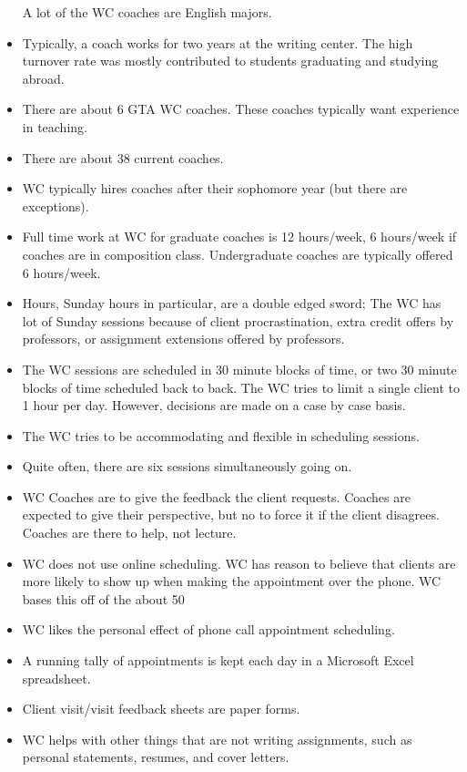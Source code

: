 \documentclass[12pt]{article} %
\begin{document}
\begin{itemize}
    A lot of the WC coaches are English majors.
    \item Typically, a coach works for two years at the writing center.  The high turnover rate was mostly contributed to students graduating and studying abroad.
    \item There are about 6 GTA WC coaches.  These coaches typically want experience in teaching.
    \item There are about 38 current coaches.
    \item WC typically hires coaches after their sophomore year (but there are exceptions).
    \item Full time work at WC for graduate coaches is 12 hours/week, 6 hours/week if coaches are in composition class.  Undergraduate coaches are typically offered 6 hours/week.
    \item Hours, Sunday hours in particular, are a double edged sword; The WC has lot of Sunday sessions because of client procrastination, extra credit offers by professors, or assignment extensions offered by professors.
    \item The WC sessions are scheduled in 30 minute blocks of time, or two 30 minute blocks of time scheduled back to back.  The WC tries to limit a single client to 1 hour per day.  However, decisions are made on a case by case basis.
    \item The WC tries to be accommodating and flexible in scheduling sessions.
    \item Quite often, there are six sessions simultaneously going on.
    \item WC Coaches are to give the feedback the client requests.  Coaches  are expected to give their perspective, but no to force it if the client disagrees.  Coaches are there to help, not lecture.
    \item WC does not use online scheduling.  WC has reason to believe that clients are more likely to show up when making the appointment over the phone.  WC bases this off of the about 50%
    \item WC likes the personal effect of phone call appointment scheduling.
    \item A running tally of appointments is kept each day in a Microsoft Excel spreadsheet.
    \item Client visit/visit feedback sheets are paper forms.
    \item WC helps with other things that are not writing assignments, such as personal statements, resumes, and cover letters.

\end{itemize}
\end{document}
